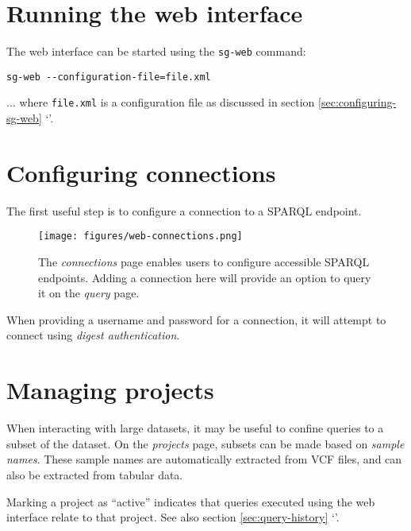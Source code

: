 \section{Running the web interface}

  The web interface can be started using the \texttt{sg-web} command:

\begin{siderules}
\begin{verbatim}
sg-web --configuration-file=file.xml
\end{verbatim}
\end{siderules}

  $\ldots{}$ where \texttt{file.xml} is a configuration file as
  discussed in section \ref{sec:configuring-sg-web}
  {\color{LinkGray}`'}.

\section{Configuring connections}

  The first useful step is to configure a connection to a SPARQL endpoint.

  \begin{figure}[h]
    \begin{center}
      \texttt{[image: figures/web-connections.png]}
    \end{center}
    \caption{The \emph{connections} page enables users to configure accessible
      SPARQL endpoints.  Adding a connection here will provide an option to
      query it on the \emph{query} page.}
    \label{fig:web-connections}
  \end{figure}

  When providing a username and password for a connection, it will attempt
  to connect using \emph{digest authentication}.

\section{Managing projects}

  When interacting with large datasets, it may be useful to confine queries to
  a subset of the dataset.  On the \emph{projects} page, subsets can be made
  based on \emph{sample names}.  These sample names are automatically extracted
  from VCF files, and can also be extracted from tabular data.

  Marking a project as ``active'' indicates that queries executed using the web
  interface relate to that project.  See also section \ref{sec:query-history}
  {\color{LinkGray}`'}.

